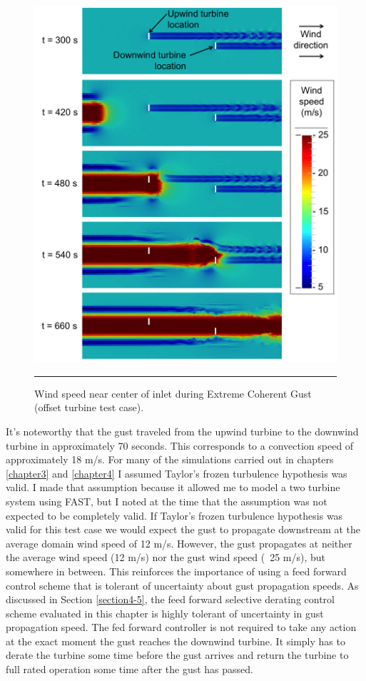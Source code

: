  \begin{figure}[htbp] \label{fig6-14} 
	\centering
		\includegraphics[width = \linewidth]{Figures/ch6Figures/fig6-14.png}
		\rule{35em}{0.5pt}
	\caption{Wind speed near center of inlet during Extreme Coherent Gust (offset turbine test case).}
\end{figure}

It's noteworthy that the gust traveled from the upwind turbine to the downwind turbine in approximately 70 seconds. This corresponds to a convection speed of approximately 18 m/s. For many of the simulations carried out in chapters \ref{chapter3} and \ref{chapter4} I assumed Taylor's frozen turbulence hypothesis was valid. I made that assumption because it allowed me to model a two turbine system using FAST, but I noted at the time that the assumption was not expected to be completely valid. If Taylor's frozen turbulence hypothesis was valid for this test case we would expect the gust to propagate downstream at the average domain wind speed of 12 m/s. However, the gust propagates at neither the average wind speed (12 m/s) nor the gust wind speed (~25 m/s), but somewhere in between. This reinforces the importance of using a feed forward control scheme that is tolerant of uncertainty about gust propagation speeds. As discussed in Section \ref{section4-5}, the feed forward selective derating control scheme evaluated in this chapter is highly tolerant of uncertainty in gust propagation speed. The fed forward controller is not required to take any action at the exact moment the gust reaches the downwind turbine. It simply has to derate the turbine some time before the gust arrives and return the turbine to full rated operation some time after the gust has passed.

